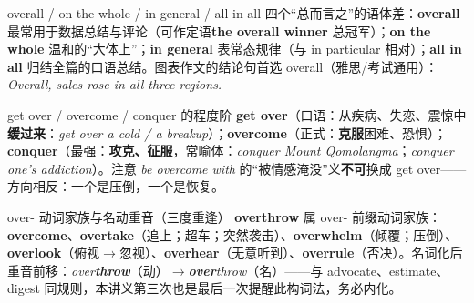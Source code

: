 \documentclass[../main.tex]{subfiles}
\begin{document}
\begin{gram}{overall / on the whole / in general / all in all}
四个“总而言之”的语体差：\textbf{overall} 最常用于数据总结与评论（可作定语\textbf{the overall winner} 总冠军）；\textbf{on the whole} 温和的“大体上”；\textbf{in general} 表常态规律（与 in particular 相对）；\textbf{all in all} 归结全篇的口语总结。图表作文的结论句首选 overall（雅思/考试通用）：\textit{Overall, sales rose in all three regions.}
\end{gram}




\begin{gram}{get over / overcome / conquer 的程度阶}
\textbf{get over}（口语：从疾病、失恋、震惊中\textbf{缓过来}：\textit{get over a cold / a breakup}）；\textbf{overcome}（正式：\textbf{克服}困难、恐惧）；\textbf{conquer}（最强：\textbf{攻克、征服}，常喻体：\textit{conquer Mount Qomolangma}；\textit{conquer one's addiction}）。注意 \textit{be overcome with} 的“被情感淹没”义\textbf{不可}换成 get over——方向相反：一个是压倒，一个是恢复。
\end{gram}




\begin{gram}{over- 动词家族与名动重音（三度重逢）}
\textbf{overthrow} 属 over- 前缀动词家族：\textbf{overcome}、\textbf{overtake}（追上；超车；突然袭击）、\textbf{overwhelm}（倾覆；压倒）、\textbf{overlook}（俯视$\to$忽视）、\textbf{overhear}（无意听到）、\textbf{overrule}（否决）。名词化后重音前移：\textit{over\textbf{throw}}（动）$\to$\textit{\textbf{over}throw}（名）——与 advocate、estimate、digest 同规则，本讲义第三次也是最后一次提醒此构词法，务必内化。
\end{gram}
\end{document}
